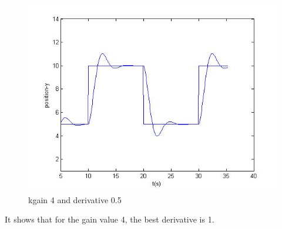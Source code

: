\begin{figure}[!htb]
\endminipage\hfill
{}%
  \includegraphics[width=\linewidth]{fig/gain4d05.jpg}
  \caption{kgain 4 and derivative 0.5}
\endminipage
\end{figure}
It shows that for the gain value 4, the best derivative is 1.
